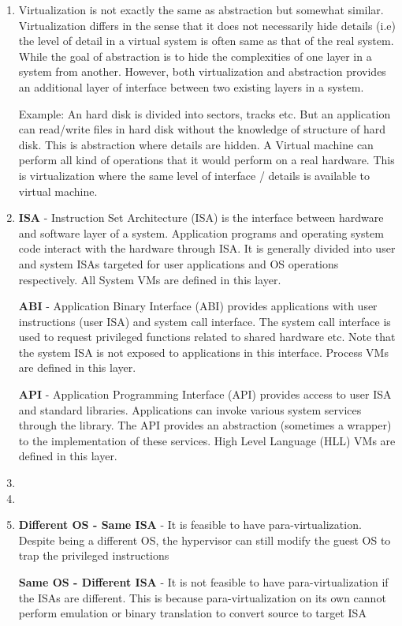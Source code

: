 \documentclass[11pt,a4paper,oneside]{article}
\begin{document}
\begin{enumerate}
		\item Virtualization is not exactly the same as abstraction but somewhat similar. Virtualization differs in the sense that it does not necessarily hide details (i.e) the level of detail in a virtual system is often same as that of the real system. While the goal of abstraction is to hide the complexities of one layer in a system from another. However, both virtualization and abstraction provides an additional layer of interface between two existing layers in a system.
		
	    Example: An hard disk is divided into sectors, tracks etc. But an application can read/write files in hard disk without the knowledge of structure of hard disk. This is abstraction where details are hidden. A Virtual machine can perform all kind of operations that it would perform on a real hardware. This is virtualization where the same level of interface / details is available to virtual machine. 
		
		\item \textbf{ISA} - Instruction Set Architecture (ISA) is the interface between hardware and software layer of a system. Application programs and operating system code interact with the hardware through ISA. It is generally divided into user and system ISAs targeted for user applications and OS operations respectively. All System VMs are defined in this layer.
		
		\textbf{ABI} - Application Binary Interface (ABI) provides applications with user instructions (user ISA) and system call interface. The system call interface is used to request privileged functions related to shared hardware etc. Note that the system ISA is not exposed to applications in this interface. Process VMs are defined in this layer.
		
		\textbf{API} - Application Programming Interface (API) provides access to user ISA and standard libraries. Applications can invoke various system services through the library. The API provides an abstraction (sometimes a wrapper) to the implementation of these services. High Level Language (HLL) VMs are defined in this layer. 
		\item 
		\item
		\item \textbf{Different OS - Same ISA} - It is feasible to have para-virtualization. Despite being a different OS, the hypervisor can still modify the guest OS to trap the privileged instructions
		
		\textbf{Same OS - Different ISA} - It is not feasible to have para-virtualization if the ISAs are different. This is because para-virtualization on its own cannot perform emulation or binary translation to convert source to target ISA
		

\end{enumerate}
\end{document}
